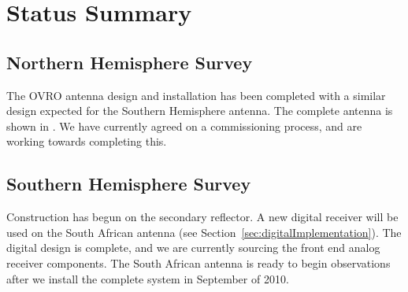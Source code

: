 \clearpage
\section{Status Summary}

\subsection{Northern Hemisphere Survey}

The OVRO antenna design and installation has been completed with a similar design expected for the Southern Hemisphere antenna. The complete antenna is shown in . We have currently agreed on a commissioning process, and are working towards completing this.






\subsection{Southern Hemisphere Survey}
Construction has begun on the secondary reflector. A new digital receiver will be used on the South African antenna (see Section~\ref{sec:digitalImplementation}). The digital design is complete, and we are currently sourcing the front end analog receiver components. The South African antenna is ready to begin observations after we install the complete system in September of 2010.
